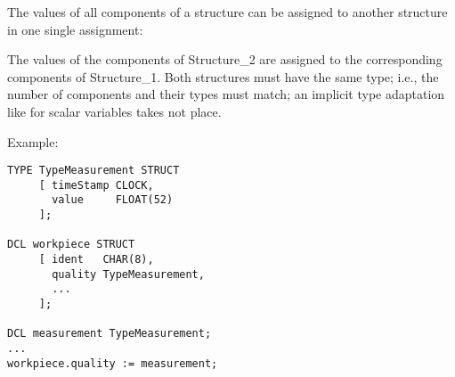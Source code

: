 The values of all components of a structure can be assigned to another
structure in one single assignment:

\begin{grammarframe}

\end{grammarframe}

The values of the components of Structure\_2 are assigned to the
corresponding components of Structure\_1. Both structures must have the same
type; i.e., the number of components and their types must match; an
implicit type adaptation like for scalar variables takes not place.

Example:

\begin{lstlisting}
TYPE TypeMeasurement STRUCT
     [ timeStamp CLOCK, 
       value     FLOAT(52)
     ];

DCL workpiece STRUCT
     [ ident   CHAR(8),
       quality TypeMeasurement,
       ... 
     ];

DCL measurement TypeMeasurement;
...    
workpiece.quality := measurement;
\end{lstlisting}

